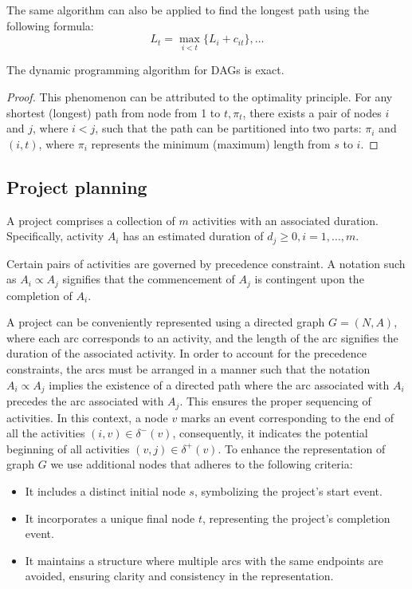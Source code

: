 The same algorithm can also be applied to find the longest path using the following formula:
\[L_t=\max_{i<t}\{L_i+c_{it}\},\dots\]

\begin{proposition}
    The dynamic programming algorithm for DAGs is exact. 
\end{proposition}
\begin{proof}
    This phenomenon can be attributed to the optimality principle.
    For any shortest (longest) path from node from 1 to $t,\pi_t$, there exists a pair of nodes $i$ and $j$, where $i < j$,  such that the path can be partitioned into two parts: $\pi_i$ and $(i,t)$, where $\pi_i$ represents the minimum (maximum) length from $s$ to $i$.
\end{proof}

\subsection{Project planning}
\begin{definition}
    A project  comprises a collection of $m$ activities with an associated duration. 
    Specifically, activity $A_i$ has an estimated duration of $d_j \geq 0, i=1,\dots,m$. 
\end{definition}
\begin{definition}
    Certain pairs of activities are governed by precedence constraint. 
    A notation such as $A_i \varpropto A_j$ signifies that the commencement of $A_j$ is contingent upon the completion of $A_i$. 
\end{definition}
A project can be conveniently represented using a directed graph $G = (N, A)$, where each arc corresponds to an activity, and the length of the arc signifies the duration of the associated activity.
In order to account for the precedence constraints, the arcs must be arranged in a manner such that the notation $A_i \varpropto A_j$ implies the existence of a directed path where the arc associated with $A_i$ precedes the arc associated with $A_j$.
This ensures the proper sequencing of activities.
In this context, a node $v$ marks an event corresponding to the end of all the activities $(i,v) \in \delta^{-}(v)$, consequently, it indicates the potential beginning of all activities $(v,j) \in \delta^{+}(v)$. 
To enhance the representation of graph $G$ we use additional nodes that adheres to the following criteria:
\begin{itemize}
    \item It includes a distinct initial node $s$, symbolizing the project's start event.
    \item It incorporates a unique final node $t$, representing the project's completion event.
    \item It maintains a structure where multiple arcs with the same endpoints are avoided, ensuring clarity and consistency in the representation. 
\end{itemize}
